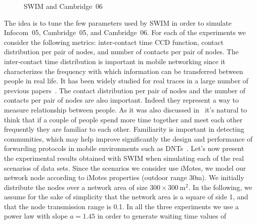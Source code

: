\documentclass[conference]{IEEEtran}
\begin{document}
\begin{figure}[t]
\centering
{}
\qquad
{}
\qquad
{}
\caption{SWIM and Cambridge~06}
\label{fig:cambridge06}
\end{figure}
The idea is to tune the few parameters used by SWIM in order to simulate
Infocom~05, Cambridge~05, and Cambridge~06. For each of the experiments we
consider the following metrics: inter-contact time CCD function, contact
distribution per pair of nodes, and number of contacts per pair of nodes. The
inter-contact time distribution is important in mobile networking since it
characterizes the frequency with which information can be transferred between
people in real life. It has been widely studied for real traces in a large
number of previous papers~\cite{hui05, hui06, leguay06, cai07mobicom,
milan07, musolesi07, cai08mobihoc}. The contact distribution per pair
of nodes and the number of contacts per pair of nodes are also important. Indeed
they represent a way to measure relationship between people. As it was also
discussed in~\cite{hui07community, hui07socio, hui08mobihoc} it's natural to
think that if a couple of people spend more time together and meet each other
frequently they are familiar to each other. Familiarity is important in
detecting communities, which may help improve significantly the design and
performance of forwarding protocols in mobile environments such as
DNTs~\cite{hui08mobihoc}. Let's now present the experimental results obtained
with SWIM when simulating each of the real scenarios of data sets.
Since the scenarios we consider use iMotes, we model our network node according
to iMotes properties (outdoor range $30\textrm{m}$). We initially distribute the
nodes over a network area of size $300\times300~\textrm{m}^2$. In the following,
we assume for the sake of simplicity that the network area is a square of side
1, and that the node transmission range is 0.1. In all the three experiments we
use a power law with slope $a=1.45$ in order to generate waiting time values of
\end{document}
